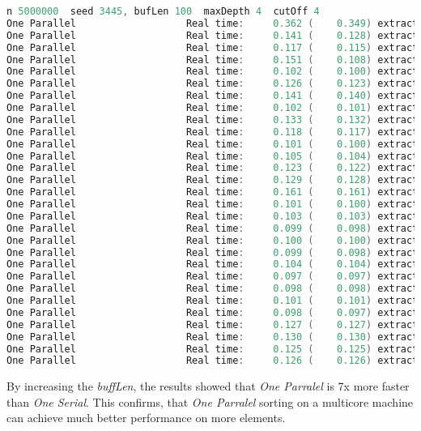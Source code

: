 \documentclass[format=acmsmall, review=false, screen=true]{acmart}
\begin{document}
\begin{lstlisting}[language=java]
n 5000000  seed 3445, bufLen 100  maxDepth 4  cutOff 4
One Parallel                   Real time:     0.362 (    0.349) extract: 5000000
One Parallel                   Real time:     0.141 (    0.128) extract: 2500000
One Parallel                   Real time:     0.117 (    0.115) extract: 1666666
One Parallel                   Real time:     0.151 (    0.108) extract: 1250000
One Parallel                   Real time:     0.102 (    0.100) extract: 1000000
One Parallel                   Real time:     0.126 (    0.123) extract: 833333
One Parallel                   Real time:     0.141 (    0.140) extract: 714285
One Parallel                   Real time:     0.102 (    0.101) extract: 625000
One Parallel                   Real time:     0.133 (    0.132) extract: 555555
One Parallel                   Real time:     0.118 (    0.117) extract: 500000
One Parallel                   Real time:     0.101 (    0.100) extract: 454545
One Parallel                   Real time:     0.105 (    0.104) extract: 416666
One Parallel                   Real time:     0.123 (    0.122) extract: 384615
One Parallel                   Real time:     0.129 (    0.128) extract: 357142
One Parallel                   Real time:     0.161 (    0.161) extract: 333333
One Parallel                   Real time:     0.101 (    0.100) extract: 312500
One Parallel                   Real time:     0.103 (    0.103) extract: 294117
One Parallel                   Real time:     0.099 (    0.098) extract: 277777
One Parallel                   Real time:     0.100 (    0.100) extract: 263157
One Parallel                   Real time:     0.099 (    0.098) extract: 250000
One Parallel                   Real time:     0.104 (    0.104) extract: 238095
One Parallel                   Real time:     0.097 (    0.097) extract: 227272
One Parallel                   Real time:     0.098 (    0.098) extract: 217391
One Parallel                   Real time:     0.101 (    0.101) extract: 208333
One Parallel                   Real time:     0.098 (    0.097) extract: 200000
One Parallel                   Real time:     0.127 (    0.127) extract: 192307
One Parallel                   Real time:     0.130 (    0.130) extract: 185185
One Parallel                   Real time:     0.125 (    0.125) extract: 178571
One Parallel                   Real time:     0.126 (    0.126) extract: 172413
\end{lstlisting}

By increasing the \emph{buffLen}, the results showed that \emph{One Parralel} is 7x more faster than \emph{One Serial}. This confirms, that \emph{One Parralel} sorting on a multicore machine can achieve much better performance on more elements.
\end{document}
